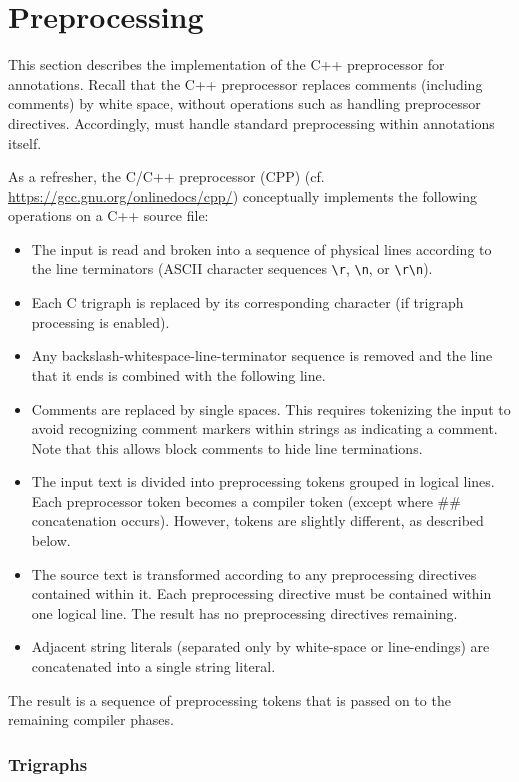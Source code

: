 \chapter{Preprocessing}
\label{sec:preprocessing}

This section describes the implementation of the C++ preprocessor for \acslpp
annotations. Recall that the C++ preprocessor replaces comments (including
\acslpp comments) by white space, without operations such as handling
preprocessor directives. Accordingly, \fclang must handle standard
preprocessing within \acslpp annotations itself.

As a refresher, the C/C++ preprocessor (CPP) (cf. \url{https://gcc.gnu.org/onlinedocs/cpp/}) conceptually implements the following operations on a C++ source file:
\begin{itemize}
	\item The input is read and broken into a sequence of physical lines according to the line terminators (ASCII character sequences \verb|\r|, \verb|\n|, or \verb|\r\n|).
	\item Each C trigraph is replaced by its corresponding character (if trigraph processing is enabled).
	\item Any backslash-whitespace-line-terminator sequence is removed and the line that it ends is combined with the following line.
	\item Comments are replaced by single spaces. This requires tokenizing the input to avoid recognizing comment markers within strings as indicating a comment. Note that this allows block comments to hide line terminations.
	\item The input text is divided into preprocessing tokens grouped in logical lines. Each preprocessor token becomes a compiler token (except where \#\# concatenation occurs). However, \acslb tokens are slightly different, as described below.
	\item The source text is transformed according to any preprocessing directives contained within it. Each preprocessing directive must be contained within one logical line. The result has no preprocessing directives remaining.
    \item Adjacent string literals (separated only by white-space or line-endings) are concatenated into a single string literal.
	
\end{itemize}
The result is a sequence of preprocessing tokens that is passed on to the 
remaining compiler phases.

\subsection{Trigraphs}

